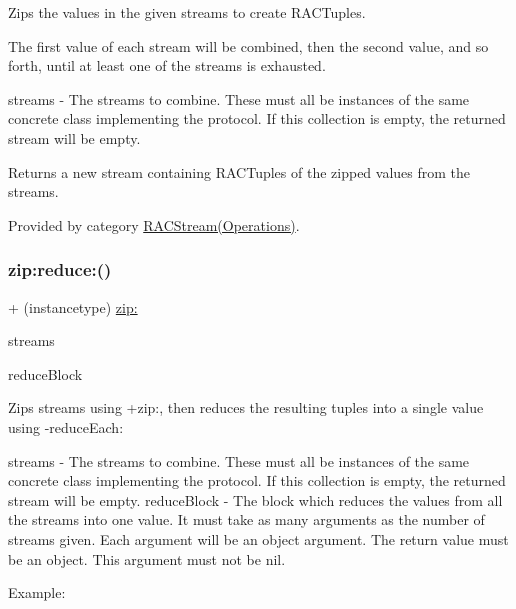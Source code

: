 Zips the values in the given streams to create R\+A\+C\+Tuples.

The first value of each stream will be combined, then the second value, and so forth, until at least one of the streams is exhausted.

streams -\/ The streams to combine. These must all be instances of the same concrete class implementing the protocol. If this collection is empty, the returned stream will be empty.

Returns a new stream containing R\+A\+C\+Tuples of the zipped values from the streams. 

Provided by category \mbox{\hyperlink{category_r_a_c_stream_07_operations_08_a90ef5f217dc285dc831cc0d45166a529}{R\+A\+C\+Stream(\+Operations)}}.

\mbox{\label{interface_r_a_c_stream_aba7b1d8c9ac130afad52b0baca8ae016}} 
\subsubsection{\texorpdfstring{zip\+:reduce\+:()}{zip:reduce:()}\hspace{0.1cm}{\footnotesize\ttfamily [1/3]}}
{\footnotesize\ttfamily + (instancetype) \mbox{\hyperlink{category_r_a_c_stream_07_operations_08_a90ef5f217dc285dc831cc0d45166a529}{zip\+:}} \begin{DoxyParamCaption}\item[{(id$<$ N\+S\+Fast\+Enumeration $>$)}]{streams }\item[{reduce:(id($^\wedge$)())}]{reduce\+Block }\end{DoxyParamCaption}}

Zips streams using +zip\+:, then reduces the resulting tuples into a single value using -\/reduce\+Each\+:

streams -\/ The streams to combine. These must all be instances of the same concrete class implementing the protocol. If this collection is empty, the returned stream will be empty. reduce\+Block -\/ The block which reduces the values from all the streams into one value. It must take as many arguments as the number of streams given. Each argument will be an object argument. The return value must be an object. This argument must not be nil.

Example\+:

